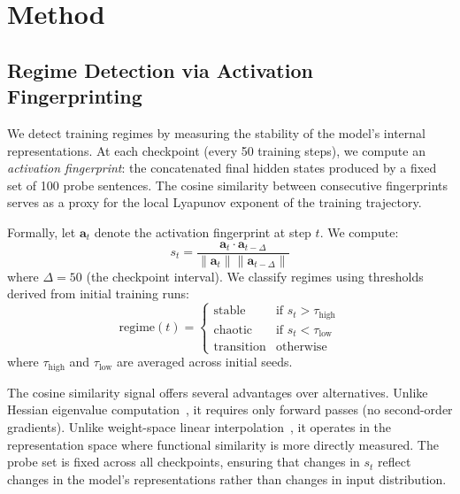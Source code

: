 \documentclass{article}
\begin{document}
\section{Method}
\label{sec:method}

\subsection{Regime Detection via Activation Fingerprinting}
\label{sec:regime}

We detect training regimes by measuring the stability of the model's internal representations.
At each checkpoint (every 50 training steps), we compute an \emph{activation fingerprint}: the concatenated final hidden states produced by a fixed set of 100 probe sentences.
The cosine similarity between consecutive fingerprints serves as a proxy for the local Lyapunov exponent of the training trajectory.

Formally, let $\mathbf{a}_t$ denote the activation fingerprint at step $t$.
We compute:
\begin{equation}
    s_t = \frac{\mathbf{a}_t \cdot \mathbf{a}_{t - \Delta}}{\|\mathbf{a}_t\| \|\mathbf{a}_{t-\Delta}\|}
\end{equation}
where $\Delta = 50$ (the checkpoint interval).
We classify regimes using thresholds derived from initial training runs:
\begin{equation}
    \text{regime}(t) = \begin{cases}
        \text{stable} & \text{if } s_t > \tau_{\text{high}} \\
        \text{chaotic} & \text{if } s_t < \tau_{\text{low}} \\
        \text{transition} & \text{otherwise}
    \end{cases}
\end{equation}
where $\tau_{\text{high}}$ and $\tau_{\text{low}}$ are averaged across initial seeds.

The cosine similarity signal offers several advantages over alternatives.
Unlike Hessian eigenvalue computation~\citep{cohen2021gradient}, it requires only forward passes (no second-order gradients).
Unlike weight-space linear interpolation~\citep{frankle2020linear}, it operates in the representation space where functional similarity is more directly measured.
The probe set is fixed across all checkpoints, ensuring that changes in $s_t$ reflect changes in the model's representations rather than changes in input distribution.
\end{document}
